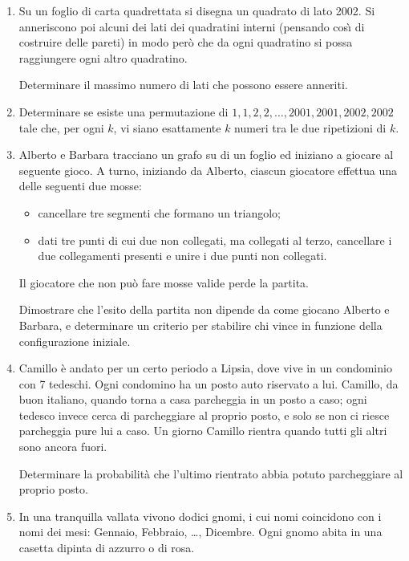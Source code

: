 \documentclass[a4paper,10pt]{article}
\begin{document}
\begin{enumerate}
	\item  Su un foglio di carta quadrettata si disegna un quadrato di lato 2002.  Si anneriscono poi alcuni dei lati dei quadratini interni (pensando cos\`{\i} di costruire delle pareti) in modo per\`{o} che da ogni quadratino si possa raggiungere ogni altro quadratino.

	Determinare il massimo numero di lati che possono essere anneriti.

	\item  Determinare se esiste una permutazione di $1,1,2,2,\ldots,2001,2001,2002,2002$ tale che, per ogni $k$, vi siano esattamente $k$ numeri tra le due ripetizioni di $k$.

	\item  Alberto e Barbara tracciano un grafo su di un foglio ed iniziano a giocare al seguente gioco. A turno, iniziando da Alberto, ciascun giocatore effettua una delle seguenti due mosse:
	\begin{itemize}
		\item  cancellare tre segmenti che formano un triangolo;

		\item  dati tre punti di cui due non collegati, ma collegati al terzo, cancellare i due collegamenti presenti e unire i due punti 	non collegati.
	\end{itemize}

	Il giocatore che non pu\`{o} fare mosse valide perde la partita.

	Dimostrare che l'esito della partita non dipende da come giocano Alberto e Barbara, e determinare un criterio per stabilire chi vince in funzione della configurazione iniziale.

	\item  Camillo \`{e} andato per un certo periodo a Lipsia, dove vive in un condominio con 7 tedeschi. Ogni condomino ha un posto auto riservato a lui. Camillo, da buon ita\-lia\-no, quando torna a casa parcheggia in un posto a caso; ogni tedesco invece cerca di parcheggiare al proprio posto, e solo se non ci riesce parcheggia pure lui a caso. Un giorno Camillo rientra quando tutti gli altri sono ancora fuori.

	Determinare la probabilit\`{a} che l'ultimo rientrato abbia potuto parcheggiare al proprio posto.

	\item In una tranquilla vallata vivono dodici gnomi, i cui nomi coincidono con i nomi dei mesi: Gennaio, Febbraio, \ldots, Dicembre.  Ogni gnomo abita in una casetta dipinta di azzurro o di rosa.


\end{enumerate}
\end{document}
